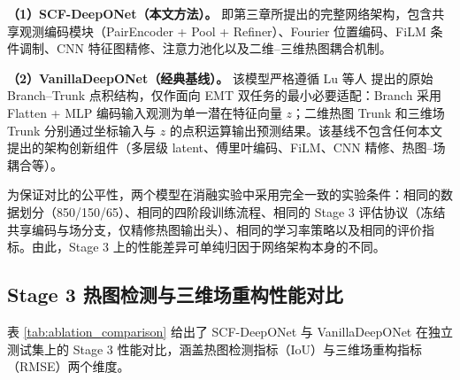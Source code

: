 \textbf{（1）SCF-DeepONet（本文方法）。}  
即第三章所提出的完整网络架构，包含共享观测编码模块（PairEncoder + Pool + Refiner）、Fourier 位置编码、FiLM 条件调制、CNN 特征图精修、注意力池化以及二维--三维热图耦合机制。

\textbf{（2）VanillaDeepONet（经典基线）。}  
该模型严格遵循 Lu 等人 提出的原始 Branch--Trunk 点积结构，仅作面向 EMT 双任务的最小必要适配：Branch 采用 Flatten + MLP 编码输入观测为单一潜在特征向量 $z$；二维热图 Trunk 和三维场 Trunk 分别通过坐标输入与 $z$ 的点积运算输出预测结果。该基线不包含任何本文提出的架构创新组件（多层级 latent、傅里叶编码、FiLM、CNN 精修、热图--场耦合等）。

为保证对比的公平性，两个模型在消融实验中采用完全一致的实验条件：相同的数据划分（850/150/65）、相同的四阶段训练流程、相同的 Stage 3 评估协议（冻结共享编码与场分支，仅精修热图输出头）、相同的学习率策略以及相同的评价指标。由此，Stage 3 上的性能差异可单纯归因于网络架构本身的不同。

\subsection{Stage 3 热图检测与三维场重构性能对比}
\label{subsec:ablation_stage3_results}

表 \ref{tab:ablation_comparison} 给出了 SCF-DeepONet 与 VanillaDeepONet 在独立测试集上的 Stage 3 性能对比，涵盖热图检测指标（IoU）与三维场重构指标（RMSE）两个维度。

